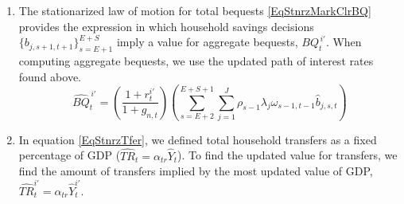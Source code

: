 \begin{enumerate}
\begin{enumerate}
\begin{enumerate}
    	\end{enumerate}

    	\item The stationarized law of motion for total bequests \eqref{EqStnrzMarkClrBQ} provides the expression in which household savings decisions $\{b_{j,s+1,t+1}\}_{s=E+1}^{E+S}$ imply a value for aggregate bequests, $BQ_{t}^{\,i'}$. When computing aggregate bequests, we use the updated path of interest rates found above.
    		\begin{equation*}
    			\hat{BQ}_{t}^{\,i'} = \left(\frac{1+r_{t}^{i'}}{1 + g_{n,t}}\right)\left(\sum_{s=E+2}^{E+S+1}\sum_{j=1}^J\rho_{s-1}\lambda_j\omega_{s-1,t-1}\hat{b}_{j,s,t}\right)
    		\end{equation*}

    	\item In equation \eqref{EqStnrzTfer}, we defined total household transfers as a fixed percentage of GDP ($\hat{TR}_t=\alpha_{tr}\hat{Y}_t$).  To find the updated value for transfers, we find the amount of transfers implied by the most updated value of GDP, $\hat{TR}_{t}^{i'}=\alpha_{tr}\hat{Y}_{t}^{i'}$.




\end{enumerate}
\end{enumerate}
